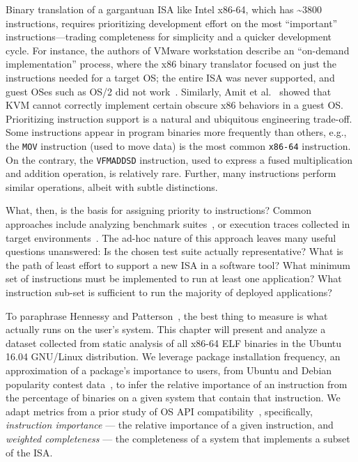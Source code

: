 Binary translation of a gargantuan ISA like Intel x86-64, which has
\textasciitilde{}3800 instructions, requires prioritizing development effort
on the most ``important'' instructions---trading completeness for simplicity
and a quicker development cycle.
For instance, the authors of VMware workstation describe an ``on-demand
implementation'' process, where the x86 binary translator focused on just the
instructions needed for a target OS; the entire ISA was never supported, and
guest OSes such as OS/2 did not work~\cite{bugnion-workstation}.
Similarly, Amit et al.~\cite{amit-161} showed that KVM cannot correctly
implement certain obscure x86 behaviors in a guest OS.
Prioritizing instruction support is a natural and ubiquitous engineering
trade-off. Some instructions appear in program binaries more frequently than
others, e.g., the \texttt{MOV} instruction (used to move data) is the most
common \texttt{x86-64} instruction. On the contrary, the \texttt{VFM\-ADD\-SD}
instruction, used to express a fused multiplication and addition operation, is
relatively rare. Further, many instructions perform similar operations, albeit
with subtle distinctions.

What, then, is the basis for assigning priority to instructions? Common
approaches include analyzing benchmark suites~\cite{SPEC2017-ab,Henning2006-ns,
bienia11benchmarking}, or execution traces collected in target
environments~\cite{elastictraces-axa}.
The ad-hoc nature of this approach leaves many useful questions unanswered:
Is the chosen test suite actually representative?
What is the path of least effort to support a new ISA in a software tool?
What minimum set of instructions must be implemented to run at least one
application? What instruction sub-set is sufficient to run the majority of
deployed applications?

To paraphrase Hennessy and Patterson~\cite{Patterson-textbook}, the best thing
to measure is what actually runs on the user's system.
This chapter will present and analyze a dataset collected from static analysis
of all x86-64 ELF binaries in the Ubuntu 16.04 GNU/Linux distribution.
We leverage package installation frequency, an approximation of a package's
importance to users, from Ubuntu and Debian popularity contest
data~\cite{ubuntu-popcon-tj,debian-popcorn-sb}, to infer the relative
importance of an instruction from the percentage of binaries on a given
system that contain that instruction.
We adapt metrics from a prior study of OS API compatibility~\cite{Tsai2016-zq},
specifically, \textit{instruction importance} --- the relative importance of
a given instruction, and \textit{weighted completeness} --- the completeness
of a system that implements a subset of the ISA.

